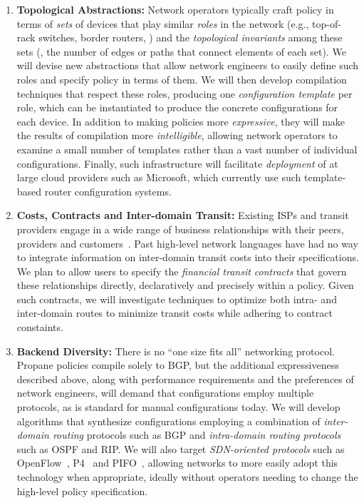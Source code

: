 \begin{enumerate}

\item {\bf Topological Abstractions:} Network operators typically craft policy in terms of \emph{sets} of devices that
play similar \emph{roles} in the network (e.g., top-of-rack switches, border routers, \etc) and the  \emph{topological invariants} among these sets (\eg, the number of edges or paths that connect elements of each set).  We will devise new abstractions that allow network engineers to easily define such roles and specify policy in terms of them.  We will then develop compilation techniques that respect these roles, producing one {\em configuration template} per role, which can be instantiated to produce the concrete configurations for each device.  
In addition to making policies more \emph{expressive},
they will make the results of compilation more \emph{intelligible}, allowing
network operators to examine a small number of templates
rather than a vast number of individual configurations.  Finally,
such infrastructure will facilitate \emph{deployment} of \Name
at large cloud providers such as Microsoft, which currently use such
template-based router configuration systems.

\item {\bf Costs, Contracts and Inter-domain Transit:} 
Existing ISPs and transit providers engage in a wide range of business
relationships with their peers, providers and customers~\cite{routingplaybook}.
Past high-level network languages have had no way to integrate
information on inter-domain transit costs into their specifications.
We plan to allow users to specify the 
\emph{financial transit contracts} that govern these relationships
directly, declaratively and precisely within a \Name policy.  Given
such contracts, we will investigate techniques to optimize 
both intra- and inter-domain routes to minimize transit costs while adhering
to contract constaints.

\item {\bf Backend Diversity:} There is no ``one size fits all'' networking protocol. Propane policies compile solely to BGP, but the additional expressiveness described above, along with performance requirements and the preferences of network engineers, will demand that configurations employ multiple protocols, as is standard for manual configurations today.  We will develop algorithms that synthesize configurations employing a combination of \emph{inter-domain routing} protocols such as BGP and \emph{intra-domain routing protocols} such as OSPF and RIP.  We will also target
\emph{SDN-oriented protocols} such as OpenFlow~\cite{openflow}, P4~\cite{P4} and PIFO~\cite{pifo}, allowing networks to more easily adopt this technology when appropriate, ideally 
without operators needing to change the high-level policy specification.


\end{enumerate}
